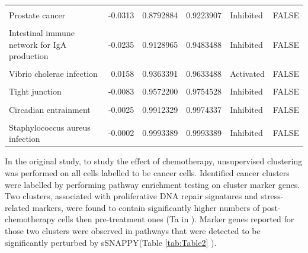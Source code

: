 \documentclass[9pt,a4paper,]{extarticle}
\begin{document}
\begin{table}
{\begin{tabular}[t]{lrrrll}
\cellcolor{gray!6}{Proteoglycans in cancer} & \cellcolor{gray!6}{0.0314} & \cellcolor{gray!6}{0.8607369} & \cellcolor{gray!6}{0.9073778} & \cellcolor{gray!6}{Activated} & \cellcolor{gray!6}{FALSE}\\
Prostate cancer & -0.0313 & 0.8792884 & 0.9223907 & Inhibited & FALSE\\
\cellcolor{gray!6}{Human papillomavirus infection} & \cellcolor{gray!6}{0.0206} & \cellcolor{gray!6}{0.9062724} & \cellcolor{gray!6}{0.9460599} & \cellcolor{gray!6}{Activated} & \cellcolor{gray!6}{FALSE}\\
\addlinespace
Intestinal immune network for IgA production & -0.0235 & 0.9128965 & 0.9483488 & Inhibited & FALSE\\
\cellcolor{gray!6}{Adipocytokine signaling pathway} & \cellcolor{gray!6}{0.0176} & \cellcolor{gray!6}{0.9261755} & \cellcolor{gray!6}{0.9574954} & \cellcolor{gray!6}{Activated} & \cellcolor{gray!6}{FALSE}\\
Vibrio cholerae infection & 0.0158 & 0.9363391 & 0.9633488 & Activated & FALSE\\
\cellcolor{gray!6}{Cytokine-cytokine receptor interaction} & \cellcolor{gray!6}{0.0148} & \cellcolor{gray!6}{0.9419725} & \cellcolor{gray!6}{0.9645077} & \cellcolor{gray!6}{Activated} & \cellcolor{gray!6}{FALSE}\\
Tight junction & -0.0083 & 0.9572200 & 0.9754528 & Inhibited & FALSE\\
\addlinespace
\cellcolor{gray!6}{Amoebiasis} & \cellcolor{gray!6}{0.0044} & \cellcolor{gray!6}{0.9793978} & \cellcolor{gray!6}{0.9933228} & \cellcolor{gray!6}{Activated} & \cellcolor{gray!6}{FALSE}\\
Circadian entrainment & -0.0025 & 0.9912329 & 0.9974337 & Inhibited & FALSE\\
\cellcolor{gray!6}{Diabetic cardiomyopathy} & \cellcolor{gray!6}{-0.0017} & \cellcolor{gray!6}{0.9927728} & \cellcolor{gray!6}{0.9974337} & \cellcolor{gray!6}{Inhibited} & \cellcolor{gray!6}{FALSE}\\
Staphylococcus aureus infection & -0.0002 & 0.9993389 & 0.9993389 & Inhibited & FALSE\\
\bottomrule
\end{tabular}}
\end{table}

In the original study\citep{Zhang2022}, to study the effect of chemotherapy, unsupervised clustering was performed on all cells labelled to be cancer cells. Identified cancer clusters were labelled by performing pathway enrichment testing on cluster marker genes. Two clusters, associated with proliferative DNA repair signatures and stress-related markers, were found to contain significantly higher numbers of post-chemotherapy cells then pre-treatment ones (Ta in \citet{Zhang2022}). Marker genes reported for those two clusters were observed in pathways that were detected to be significantly perturbed by sSNAPPY(Table \ref{tab:Table2} ).
\end{document}
